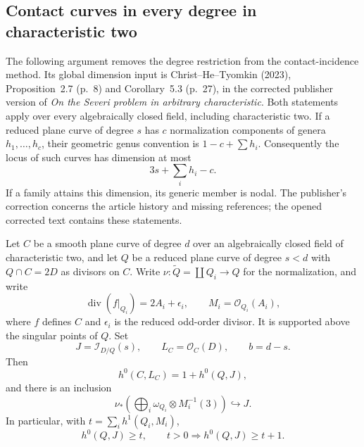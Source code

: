 \subsection{Contact curves in every degree in characteristic two}
\label{subsec:all-degree-char2-contact}

The following argument removes the degree restriction from the
contact-incidence method.  Its global dimension input is
Christ--He--Tyomkin (2023), Proposition~2.7 (p.~8) and
Corollary~5.3 (p.~27), in the corrected publisher version of
\emph{On the Severi problem in arbitrary characteristic}.
Both statements apply over every algebraically closed field,
including characteristic two.  If a reduced plane curve of degree
$s$ has $c$ normalization components of genera $h_1,\ldots,h_c$,
their geometric genus convention is $1-c+\sum h_i$.  Consequently
the locus of such curves has dimension at most
\begin{equation}\label{eq:contact-severi-bound}
 3s+\sum_i h_i-c.
\end{equation}
If a family attains this dimension, its generic member is nodal.
The publisher's correction concerns the article history and missing
references; the opened corrected text contains these statements.

\begin{lemma}
\label{lem:contact-conductor}
Let $C$ be a smooth plane curve of degree $d$ over an algebraically
closed field of characteristic two, and let $Q$ be a reduced plane
curve of degree $s<d$ with $Q\cap C=2D$ as divisors on $C$.
Write $\nu:\widetilde Q=\coprod Q_i\to Q$ for the normalization,
and write
\[
 \operatorname{div}(f|_{Q_i})=2A_i+\epsilon_i,
 \qquad M_i=\mathcal O_{Q_i}(A_i),
\]
where $f$ defines $C$ and $\epsilon_i$ is the reduced odd-order
divisor.  It is supported above the singular points of $Q$.
Set
\[
 J=\mathcal I_{D/Q}(s),\qquad
 L_C=\mathcal O_C(D),\qquad
 b=d-s.
\]
Then
\begin{equation}\label{eq:general-contact-reciprocity}
 h^0(C,L_C)=1+h^0(Q,J),
\end{equation}
and there is an inclusion
\begin{equation}\label{eq:conductor-section-inclusion}
 \nu_*\left(\bigoplus_i
       \omega_{Q_i}\otimes M_i^{-1}(3)\right)\hookrightarrow J.
\end{equation}
In particular, with $t=\sum_i h^1(Q_i,M_i)$,
\begin{equation}\label{eq:contact-h1-cancellation}
 h^0(Q,J)\ge t,
 \qquad t>0\Longrightarrow h^0(Q,J)\ge t+1.
\end{equation}
\end{lemma}

